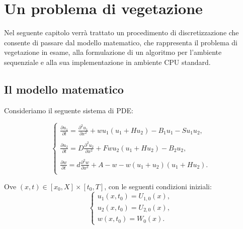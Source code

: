 \thispagestyle{headings}
\chapter{Un problema di vegetazione} \label{cap:modello-numerico}

\noindent Nel seguente capitolo verrà trattato un procedimento di discretizzazione che consente di passare dal modello matematico, che rappresenta il problema di vegetazione in esame, alla formulazione di un algoritmo per l'ambiente sequenziale e alla sua implementazione in ambiente CPU standard.

\section{Il modello matematico} \label{sec:math-model}
\noindent Consideriamo il seguente sistema di PDE:

\begin{equation}
    \begin{cases}
        \displaystyle
        \frac{\partial u_1}{\partial t} = \frac{\partial^2 u_1}{\partial x^2} + wu_1(u_1 + Hu_2) - B_1u_1 - Su_1u_2, \\\\
        \displaystyle
        \frac{\partial u_2}{\partial t} = D\frac{\partial^2 u_2}{\partial x^2} + Fwu_2(u_1 + Hu_2) - B_2u_2, \\\\
        \displaystyle
        \frac{\partial w}{\partial t} = d\frac{\partial^2 w}{\partial x^2} + A - w - w(u_1 + u_2)(u_1 + Hu_2). \\
    \end{cases}
    \label{eq:main-equation}
\end{equation}

\noindent Ove $(x, t) \in [x_0, X] \times [t_0, T]$, con le seguenti condizioni iniziali:
\begin{equation}
    \begin{cases}
        u_1(x, t_0) = U_{1, 0}(x),\\
        u_2(x, t_0) = U_{2, 0}(x),\\
        w(x, t_0) = W_0(x).
    \end{cases}
    \label{eq:main-equation-intial-condition}
\end{equation}

